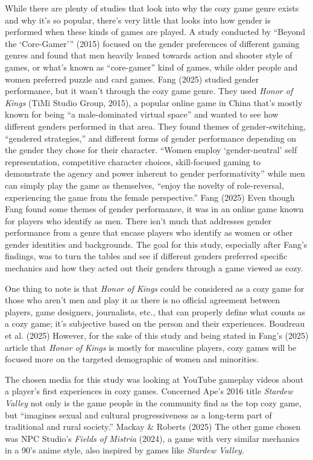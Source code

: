 \documentclass[
  12pt,
  letterpaper,
  DIV=11,
  numbers=noendperiod]{scrreprt}
\begin{document}
While there are plenty of studies that look into why the cozy game genre
exists and why it's so popular, there's very little that looks into how
gender is performed when these kinds of games are played. A study
conducted by {``Beyond the {`Core-Gamer'}''} (2015) focused on the
gender preferences of different gaming genres and found that men heavily
leaned towards action and shooter style of games, or what's known as
``core-gamer'' kind of games, while older people and women preferred
puzzle and card games. Fang (2025) studied gender performance, but it
wasn't through the cozy game genre. They used \emph{Honor of Kings}
(TiMi Studio Group, 2015), a popular online game in China that's mostly
known for being ``a male-dominated virtual space'' and wanted to see how
different genders performed in that area. They found themes of
gender-switching, ``gendered strategies,'' and different forms of gender
performance depending on the gender they chose for their character.
``Women employ `gender-neutral' self representation, competitive
character choices, skill-focused gaming to demonstrate the agency and
power inherent to gender performativity'' while men can simply play the
game as themselves, ``enjoy the novelty of role-reversal, experiencing
the game from the female perspective.'' Fang (2025) Even though Fang
found some themes of gender performance, it was in an online game known
for players who identify as men. There isn't much that addresses gender
performance from a genre that encase players who identify as women or
other gender identities and backgrounds. The goal for this study,
especially after Fang's findings, was to turn the tables and see if
different genders preferred specific mechanics and how they acted out
their genders through a game viewed as cozy.

One thing to note is that \emph{Honor of Kings} could be considered as a
cozy game for those who aren't men and play it as there is no official
agreement between players, game designers, journalists, etc., that can
properly define what counts as a cozy game; it's subjective based on the
person and their experiences. Boudreau et al. (2025) However, for the
sake of this study and being stated in Fang's (2025) article that
\emph{Honor of Kings} is mostly for masculine players, cozy games will
be focused more on the targeted demographic of women and minorities.

The chosen media for this study was looking at YouTube gameplay videos
about a player's first experiences in cozy games. Concerned Ape's 2016
title \emph{Stardew Valley} not only is the game people in the community
find as the top cozy game, but ``imagines sexual and cultural
progressiveness as a long-term part of traditional and rural society.''
Mackay \& Roberts (2025) The other game chosen was NPC Studio's
\emph{Fields of Mistria} (2024), a game with very similar mechanics in a
90's anime style, also inspired by games like \emph{Stardew Valley}.
\end{document}
